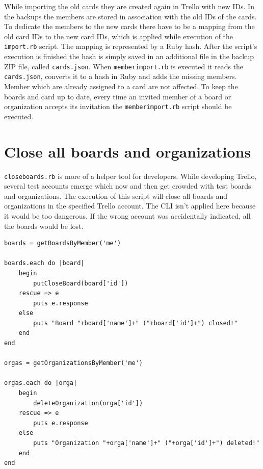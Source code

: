 While importing the old cards they are created again in Trello with new IDs. In the backups the members are stored in association with the old IDs of the cards. To dedicate the members to the new cards there have to be a mapping from the old card IDs to the new card IDs, which is applied while execution of the \texttt{import.rb} script. The mapping is represented by a Ruby hash. After the script's execution is finished the hash is simply saved in an additional file in the backup ZIP file, called \texttt{cards.json}. When \texttt{memberimport.rb} is executed it reads the \texttt{cards.json}, converts it to a hash in Ruby and adds the missing members. Member which are already assigned to a card are not affected. To keep the boards and card up to date, every time an invited member of a board or organization accepts its invitation the \texttt{memberimport.rb} script should be executed.

\section{Close all boards and organizations}

\texttt{closeboards.rb} is more of a helper tool for developers. While developing Trello, several test accounts emerge which now and then get crowded with test boards and organizations. The execution of this script will close all boards and organizations in the specified Trello account. The CLI isn't applied here because it would be too dangerous. If the wrong account was accidentally indicated, all the boards would be lost.

\begin{lstlisting}[aboveskip=1\baselineskip, caption=\texttt{closeboards.rb}, label=listing060]
boards = getBoardsByMember('me')

boards.each do |board|	
	begin
		putCloseBoard(board['id'])
	rescue => e
		puts e.response
	else
		puts "Board "+board['name']+" ("+board['id']+") closed!"
	end	
end

orgas = getOrganizationsByMember('me')

orgas.each do |orga|	
	begin
		deleteOrganization(orga['id'])
	rescue => e
		puts e.response
	else
		puts "Organization "+orga['name']+" ("+orga['id']+") deleted!"
	end	
end
\end{lstlisting}